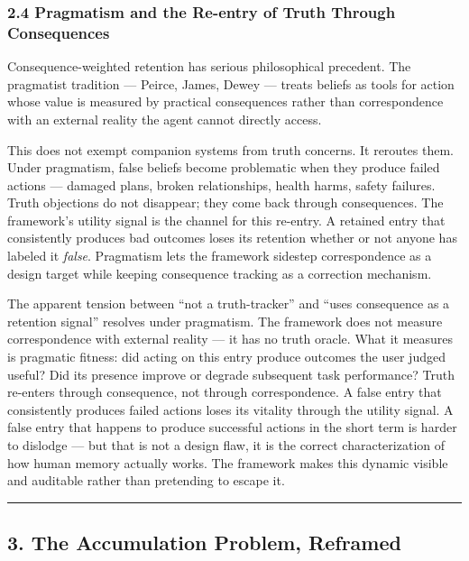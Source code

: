 \documentclass[
  11pt,
]{article}
\begin{document}
\hypertarget{pragmatism-and-the-re-entry-of-truth-through-consequences}{%
\subsubsection{2.4 Pragmatism and the Re-entry of Truth Through
Consequences}\label{pragmatism-and-the-re-entry-of-truth-through-consequences}}

Consequence-weighted retention has serious philosophical precedent. The
pragmatist tradition --- Peirce, James, Dewey --- treats beliefs as
tools for action whose value is measured by practical consequences
rather than correspondence with an external reality the agent cannot
directly access.

This does not exempt companion systems from truth concerns. It reroutes
them. Under pragmatism, false beliefs become problematic when they
produce failed actions --- damaged plans, broken relationships, health
harms, safety failures. Truth objections do not disappear; they come
back through consequences. The framework's utility signal is the channel
for this re-entry. A retained entry that consistently produces bad
outcomes loses its retention whether or not anyone has labeled it
\emph{false}. Pragmatism lets the framework sidestep correspondence as a
design target while keeping consequence tracking as a correction
mechanism.

The apparent tension between ``not a truth-tracker'' and ``uses
consequence as a retention signal'' resolves under pragmatism. The
framework does not measure correspondence with external reality --- it
has no truth oracle. What it measures is pragmatic fitness: did acting
on this entry produce outcomes the user judged useful? Did its presence
improve or degrade subsequent task performance? Truth re-enters through
consequence, not through correspondence. A false entry that consistently
produces failed actions loses its vitality through the utility signal. A
false entry that happens to produce successful actions in the short term
is harder to dislodge --- but that is not a design flaw, it is the
correct characterization of how human memory actually works. The
framework makes this dynamic visible and auditable rather than
pretending to escape it.

\begin{center}\rule{0.5\linewidth}{0.5pt}\end{center}

\hypertarget{the-accumulation-problem-reframed}{%
\subsection{3. The Accumulation Problem,
Reframed}\label{the-accumulation-problem-reframed}}
\end{document}
